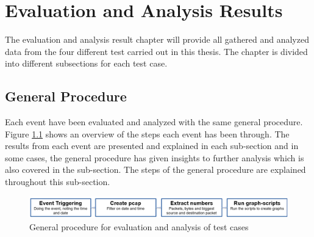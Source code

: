 \chapter{Evaluation and Analysis Results}
The evaluation and analysis result chapter will provide all gathered and analyzed data from the four different test carried out in this thesis. The chapter is divided into different subsections for each test case. 

\section{General Procedure}
Each event have been evaluated and analyzed with the same general procedure. Figure \ref{fig:GeneralProcedure} shows an overview of the steps each event has been through. The results from each event are presented and explained in each sub-section and in some cases, the general procedure has given insights to further analysis which is also covered in the sub-section. The steps of the general procedure are explained throughout this sub-section.

\begin{figure}[H]
    \centering
    \includegraphics[width=\textwidth]{figures/GeneralProcedure.png}
    \caption{General procedure for evaluation and analysis of test cases}
    \label{fig:GeneralProcedure}
\end{figure}


